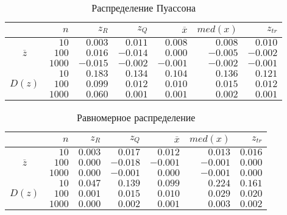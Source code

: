 \documentclass[zuev_report2.tex]{subfiles}
\begin{document}
\begin{table}[H]
\centering
\caption{Распределение Пуассона}
\begin{tabular}{c*6r}
\toprule
{} &         
$n$ & 
\centering $z_R$ & 
\centering $z_Q$ &
\centering $\overline{x}$& 
\centering $med(x)$ &
\centering $z_{tr}$ \tabularnewline
\midrule
\multirow{3}{*}{$\overline{z}$}
& $10$    & $ 0.003$  & $ 0.011$  & $ 0.008$  & $ 0.008$  & $ 0.010$ \\
& $100$   & $ 0.016$  & $-0.014$  & $ 0.000$  & $-0.005$  & $-0.002$ \\
& $1000$  & $-0.015$  & $-0.002$  & $-0.001$  & $-0.002$  & $-0.001$ \\
\midrule
\multirow{3}{*}{$D(z)$}
& $10$    & $0.183$  & $0.134$  & $0.104$  & $0.136$  & $0.121$ \\
& $100$   & $0.099$  & $0.012$  & $0.010$  & $0.015$  & $0.012$ \\
& $1000$  & $0.060$  & $0.001$  & $0.001$  & $0.002$  & $0.001$ \\
\bottomrule
\end{tabular}
\label{table:poisson}
\end{table}

\begin{table}[H]
\centering
\caption{Равномерное распределение}
\begin{tabular}{c*6r}
\toprule
{} &         
$n$ & 
\centering $z_R$ & 
\centering $z_Q$ &
\centering $\overline{x}$& 
\centering $med(x)$ &
\centering $z_{tr}$ \tabularnewline
\midrule
\multirow{3}{*}{$\overline{z}$}
& $10$    & $ 0.003$  & $ 0.017$  & $ 0.012$  & $ 0.013$  & $ 0.016$ \\
& $100$   & $ 0.000$  & $-0.018$  & $-0.001$  & $-0.001$  & $ 0.000$ \\
& $1000$  & $ 0.000$  & $-0.001$  & $ 0.000$  & $-0.001$  & $ 0.000$ \\
\midrule
\multirow{3}{*}{$D(z)$}
& $10$    & $0.047$  & $0.139$  & $0.099$  & $0.224$  & $0.161$ \\
& $100$   & $0.001$  & $0.015$  & $0.010$  & $0.029$  & $0.020$ \\
& $1000$  & $0.000$  & $0.002$  & $0.001$  & $0.003$  & $0.002$ \\
\bottomrule
\end{tabular}
\label{table:uniform}
\end{table}
\newpage
\end{document}
